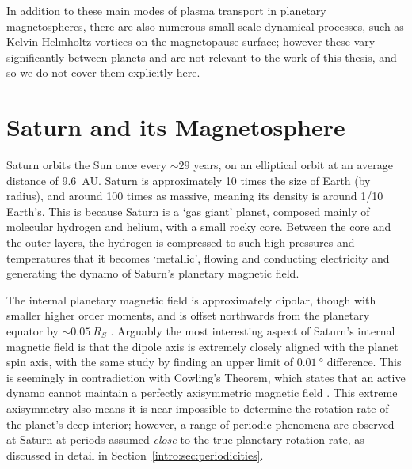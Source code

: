 {In addition to these main modes of plasma transport in planetary magnetospheres, there are also numerous small-scale dynamical processes, such as Kelvin-Helmholtz vortices on the magnetopause surface; however these vary significantly between planets and are not relevant to the work of this thesis, and so we do not  cover them explicitly here.

\section{Saturn and its Magnetosphere}\label{intro:sec:saturn}
Saturn orbits the Sun once every ${\sim}29$ years, on an elliptical orbit at an average distance of \SI{9.6}{AU}. Saturn is approximately 10 times the size of Earth (by radius), and around 100 times as massive, meaning its density is around 1/10 Earth's. This is because Saturn is a `gas giant' planet, composed mainly of molecular hydrogen and helium, with a small rocky core. Between the core and the outer layers, the hydrogen is compressed to such high pressures and temperatures that it becomes `metallic', flowing and conducting electricity and generating the dynamo of Saturn's planetary magnetic field.

The internal planetary magnetic field is approximately dipolar, though with smaller higher order moments, and is offset northwards from the planetary equator by ${\sim}\SI{0.05}{R_S}$ \citep{dougherty2018}. Arguably the most interesting aspect of Saturn's internal magnetic field is that the dipole axis is extremely closely aligned with the planet spin axis, with the same study by \citet{dougherty2018} finding an upper limit of $\SI{0.01}{\degree}$ difference. This is seemingly in contradiction with Cowling's Theorem, which states that an active dynamo cannot maintain a perfectly axisymmetric magnetic field \citep{cowling1933}. This extreme axisymmetry also means it is near impossible to determine the rotation rate of the planet's deep interior; however, a range of periodic phenomena are observed at Saturn at periods assumed \textit{close} to the true planetary rotation rate, as discussed in detail in Section~\ref{intro:sec:periodicities}.

}
